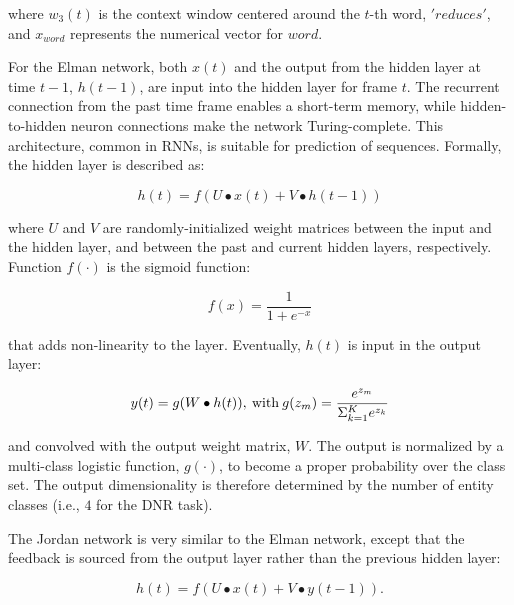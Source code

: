 \documentclass[11pt,letterpaper]{article}
\begin{document}
\noindent where $w_{3}(t)$ is the context window centered around the $t$-th word, $'reduces'$, and $x_{word}$ represents the numerical vector for $word$. 

For the Elman network, both $x(t)$ and the output from the hidden layer at time $t-1$, $h(t -1)$, are input into the hidden layer for frame $t$. The recurrent connection from the past time frame enables a short-term memory, while hidden-to-hidden neuron connections make the network Turing-complete. This architecture, common in RNNs, is suitable for prediction of sequences. Formally, the hidden layer is described as:   

\begin{equation}
 h(t) = f(U \bullet x(t) + V \bullet h(t-1) )
\end{equation}

\noindent where $U$ and $V$ are randomly-initialized weight matrices between the input and the hidden layer, and between the past and current hidden layers, respectively. Function $f(\cdot)$ is the sigmoid function:
   
\begin{equation}
f(x)=\frac{1}{1+e^{-x}}
\end{equation} 

\noindent that adds non-linearity to the layer. Eventually, $h(t)$ is input in the output layer:

\begin{equation}
\label{eq4}
y(t) = g(W \bullet h(t)), \hspace{0.03in} \text{with} \hspace{0.03in}  g(z_{m}) = \frac{e^{z_{m}}} {\Sigma _{k=1}^Ke^{z_{k}} }
\end{equation}

\noindent and convolved with the output weight matrix, $W$. The output is normalized by a multi-class logistic function, $g(\cdot)$, to become a proper probability over the class set. The output dimensionality is therefore determined by the number of entity classes (i.e., $4$ for the DNR task).

The Jordan network is very similar to the Elman network, except that the feedback is sourced from the output layer rather than the previous hidden layer:


\begin{equation}
h(t) = f( U \bullet x(t) + V \bullet y(t-1) ).
\end{equation}
\end{document}
